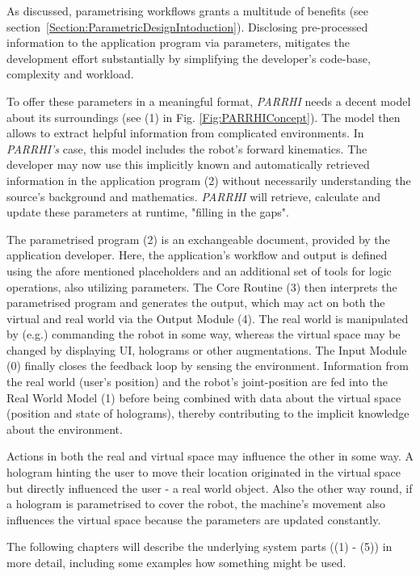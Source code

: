 As discussed, parametrising workflows grants a multitude of benefits (see section~\ref{Section:ParametricDesignIntoduction}). Disclosing pre-processed information to the application program via parameters, mitigates the development effort substantially by simplifying the developer's code-base, complexity and workload.  

To offer these parameters in a meaningful format, \textit{PARRHI} needs a decent model about its surroundings (see (1) in Fig. \ref{Fig:PARRHIConcept}). The model then allows to extract helpful information from complicated environments. In \textit{PARRHI's} case, this model includes the robot's forward kinematics. The developer may now use this implicitly known and automatically retrieved information in the application program (2) without necessarily understanding the source's background and mathematics. \textit{PARRHI} will retrieve, calculate and update these parameters at runtime, "filling in the gaps".

The parametrised program (2) is an exchangeable document, provided by the application developer. Here, the application's workflow and output is defined using the afore mentioned placeholders and an additional set of tools for logic operations, also utilizing parameters. The Core Routine (3) then interprets the parametrised program and generates the output, which may act on both the virtual and real world via the Output Module (4). The real world is manipulated by (e.g.) commanding the robot in some way, whereas the virtual space may be changed by displaying UI, holograms or other augmentations. The Input Module (0) finally closes the feedback loop by sensing the environment. Information from the real world (user's position) and the robot's joint-position are fed into the Real World Model (1) before being combined with data about the virtual space (position and state of holograms), thereby contributing to the implicit knowledge about the environment.

Actions in both the real and virtual space may influence the other in some way. A hologram hinting the user to move their location originated in the virtual space but directly influenced the user - a real world object. Also the other way round, if a hologram is parametrised to cover the robot, the machine's movement also influences the virtual space because the parameters are updated constantly.



The following chapters will describe the underlying system parts ((1) - (5)) in more detail, including some examples how something might be used. 


